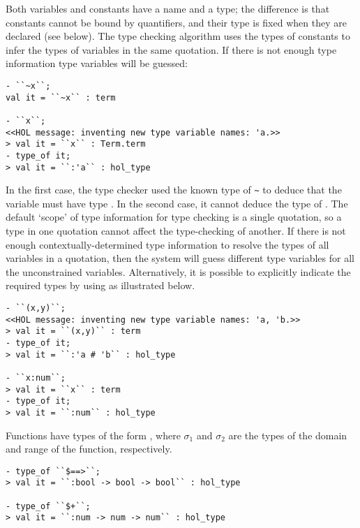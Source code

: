 Both variables and constants have a name and a type; the difference is
that constants cannot be bound by quantifiers, and their type is fixed
when they are declared (see below). The type checking algorithm uses
the types of constants to infer the types of variables in the same
quotation. If there is not enough type information type variables will
be guessed:

\begin{session}\begin{verbatim}
- ``~x``;
val it = ``~x`` : term

- ``x``;
<<HOL message: inventing new type variable names: 'a.>>
> val it = ``x`` : Term.term
- type_of it;
> val it = ``:'a`` : hol_type
\end{verbatim}\end{session}

    In the first case, the \HOL{} type checker used the known type
     of {\small\verb|~|} to deduce that the variable
     must have type .  In the second case, it cannot
    deduce the type of .  The default `scope' of type
    information for type checking is a single quotation, so a type in
    one quotation cannot affect the type-checking of another.  If
    there is not enough contextually-determined type information to
    resolve the types of all variables in a quotation, then the system
    will guess different type variables for all the unconstrained
    variables.  Alternatively, it is possible to explicitly indicate
    the required types by using  as illustrated
    below.

\begin{session}\begin{verbatim}
- ``(x,y)``;
<<HOL message: inventing new type variable names: 'a, 'b.>>
> val it = ``(x,y)`` : term
- type_of it;
> val it = ``:'a # 'b`` : hol_type

- ``x:num``;
> val it = ``x`` : term
- type_of it;
> val it = ``:num`` : hol_type
\end{verbatim}\end{session}

    Functions have types of the form ,
    where $\sigma_1$ and $\sigma_2$ are the types of the domain and
    range of the function, respectively.

\begin{session}\begin{verbatim}
- type_of ``$==>``;
> val it = ``:bool -> bool -> bool`` : hol_type

- type_of ``$+``;
> val it = ``:num -> num -> num`` : hol_type
\end{verbatim}\end{session}

